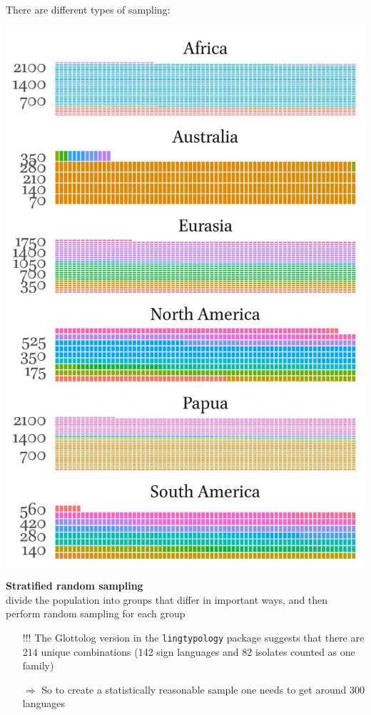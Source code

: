 \documentclass[13pt, t]{beamer}
\begin{document}
\begin{frame}{There are different types of sampling:}
\begin{multicols}{2}
\includegraphics[width=\linewidth]{images/05_families_by_area}
\columnbreak

\textbf{Stratified random sampling}\\
divide the population into groups that differ in important ways, and then perform random sampling for each group\pause\\
\begin{itemize}
\item[\color{colorblue}!!!] The Glottolog version in the \texttt{\small lingtypology} package suggests that there are \\ \alert{214 unique combinations} (142 sign languages and 82 isolates counted as one family) %
\pause
\item[\color{colorblue}$\Rightarrow$] So to create a statistically reasonable sample one needs to get around 300 languages
\end{itemize}
\end{multicols}
\end{frame}
\end{document}
